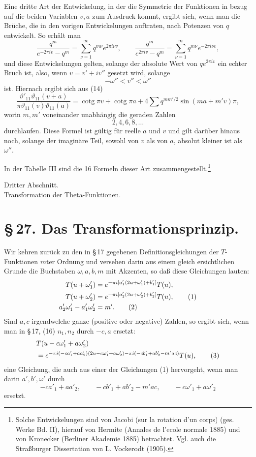 \documentclass[11pt]{article}
\providecommand{\tht}{\vartheta}
\providecommand{\cotg}{\operatorname{cotg}}
\begin{document}
Eine dritte Art der Entwickelung, in der die Symmetrie der Funktionen in bezug auf die beiden Variablen $v,a$ zum Ausdruck kommt, ergibt sich, wenn man die Brüche, die in den vorigen Entwickelungen auftraten, nach Potenzen von $q$ entwickelt. So erhält man
\[
\frac{q^m}{e^{-2\pi iv}-q^m}=\sum_{\nu=1}^{\infty}q^{m\nu}e^{2\pi i\nu v},
\qquad
\frac{q^m}{e^{2\pi iv}-q^m}=\sum_{\nu=1}^{\infty}q^{m\nu}e^{-2\pi i\nu v},
\]
und diese Entwickelungen gelten, solange der absolute Wert von $qe^{2\pi iv}$ ein echter Bruch ist, also, wenn $v=v'+iv''$ gesetzt wird, solange
\[
-\omega''<v''<\omega''
\]
ist. Hiernach ergibt sich aus (14)
\[
\frac{\tht'_{11}\tht_{11}(v+a)}{\pi\tht_{11}(v)\tht_{11}(a)}
=\cotg\pi v+\cotg\pi a+4\sum q^{mm'/2}\sin(m a+m'v)\pi,
\]
worin $m,m'$ voneinander unabhängig die geraden Zahlen
\[
2,4,6,8,\ldots
\]
durchlaufen. Diese Formel ist gültig für reelle $a$ und $v$ und gilt darüber hinaus noch, solange der imaginäre Teil, sowohl von $v$ als von $a$, absolut kleiner ist als $\omega''$.

In der Tabelle III sind die 16 Formeln dieser Art zusammengestellt.\footnote{Solche Entwickelungen sind von Jacobi (sur la rotation d'un corps) (ges. Werke Bd. II), hierauf von Hermite (Annales de l'ecole normale 1885) und von Kronecker (Berliner Akademie 1885) betrachtet. Vgl. auch die Straßburger Dissertation von L. Vockerodt (1905).}



\begin{center}
{\large Dritter Abschnitt.}\\[0.7em]
{\Large Transformation der Theta-Funktionen.}
\end{center}

\section*{\S\,27. Das Transformationsprinzip.}

Wir kehren zurück zu den in \S\,17 gegebenen Definitionsgleichungen der $T$-Funktionen $m$ter Ordnung und versehen darin aus einem gleich ersichtlichen Grunde die Buchstaben $\omega,a,b,m$ mit Akzenten, so daß diese Gleichungen lauten:
\begin{align}
T(u+\omega'_1)&=e^{-\pi i[a'_1(2u+\omega'_1)+b'_1]}T(u),\notag\\
T(u+\omega'_2)&=e^{-\pi i[a'_2(2u+\omega'_2)+b'_2]}T(u), \tag{1}\\
a'_2\omega'_1-a'_1\omega'_2&=m'. \tag{2}
\end{align}
Sind $a,c$ irgendwelche ganze (positive oder negative) Zahlen, so ergibt sich, wenn man in \S\,17, (16) $n_1,n_2$ durch $-c,a$ ersetzt:
\begin{align}
&T(u-c\omega'_1+a\omega'_2) \notag\\
&
=e^{-\pi i(-ca'_1+aa'_2)(2u-c\omega'_1+a\omega'_2)-\pi i(-cb'_1+ab'_2-m'ac)}T(u), \tag{3}
\end{align}
eine Gleichung, die auch aus einer der Gleichungen (1) hervorgeht, wenn man darin $a',b',\omega'$ durch
\[
-ca'_1+aa'_2,
\qquad -cb'_1+ab'_2-m'ac,
\qquad -c\omega'_1+a\omega'_2
\]
ersetzt.
\end{document}
